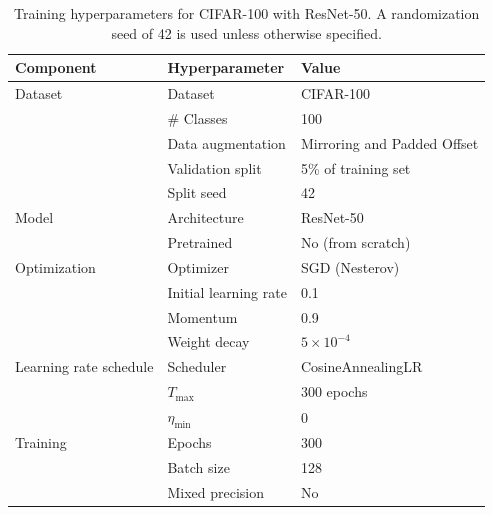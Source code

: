 \begin{table}[H]
\centering

\begin{tabular}{lll}
\toprule
Component & Hyperparameter & Value \\
\midrule
Dataset 
& Dataset             & CIFAR-100 \\
& \# Classes          & 100 \\
& Data augmentation   & Mirroring and Padded Offset \\
& Validation split    & 5\% of training set \\
& Split seed          & 42 \\
\midrule
Model 
& Architecture        & ResNet-50 \\
& Pretrained          & No (from scratch) \\
\midrule
Optimization 
& Optimizer           & SGD (Nesterov) \\
& Initial learning rate & 0.1 \\
& Momentum            & 0.9 \\
& Weight decay        & $5 \times 10^{-4}$ \\
\midrule
Learning rate schedule
& Scheduler           & CosineAnnealingLR \\
& $T_{\max}$          & 300 epochs \\
& $\eta_{\min}$       & 0 \\
\midrule
Training 
& Epochs              & 300 \\
& Batch size          & 128 \\
& Mixed precision     & No \\
\bottomrule
\end{tabular}
\caption{Training hyperparameters for CIFAR-100 with ResNet-50. A randomization seed of 42 is used unless otherwise specified.}\label{tab:hyperparams_baseline}
\end{table}





